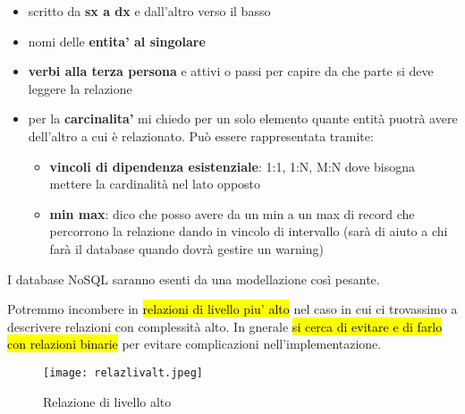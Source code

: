 \begin{itemize}
	\item scritto da \textbf{sx a dx} e dall'altro verso il basso
	
	\item nomi delle \textbf{entita' al singolare}
	
	\item \textbf{verbi alla terza persona} e attivi o passi per capire da che parte si deve leggere la relazione
	
	\item per la \textbf{carcinalita'} mi chiedo per un solo elemento quante entità puotrà avere dell'altro a cui è relazionato. Può essere rappresentata tramite:
	
		\begin{itemize}
			\item \textbf{vincoli di dipendenza esistenziale}: 1:1, 1:N, M:N dove bisogna mettere la cardinalità nel lato opposto
			\item \textbf{min max}: dico che posso avere da un min a un max di record che percorrono la relazione dando in vincolo di intervallo (sarà di aiuto a chi farà il database quando dovrà gestire un warning)
		\end{itemize}
	
	 
\end{itemize}


I database NoSQL saranno esenti da una modellazione così pesante.


Potremmo incombere in \hl{relazioni di livello piu' alto} nel caso in cui ci trovassimo a descrivere relazioni con complessità alto. In gnerale \hl{si cerca di evitare e di farlo con relazioni binarie} per evitare complicazioni nell'implementazione.


\begin{figure}[H]
\centering
\texttt{[image: relazlivalt.jpeg]}
\caption{Relazione di livello alto} 
\label{relazlivalt}
\end{figure}
